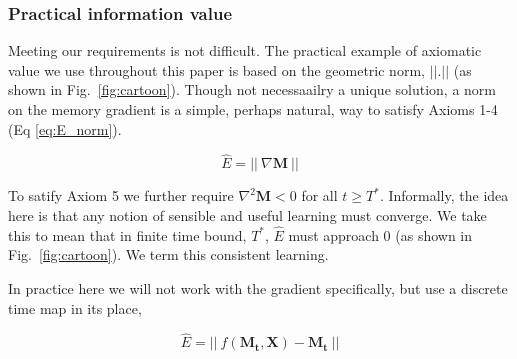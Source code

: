 \subsubsection*{Practical information value}
Meeting our requirements is not difficult. The practical example of axiomatic value we use throughout this paper is based on the geometric norm, $||.||$ (as shown in Fig.~\ref{fig:cartoon}). Though not necessaailry a unique solution, a norm on the memory gradient is a simple, perhaps natural, way to satisfy Axioms 1-4 (Eq \ref{eq:E_norm}). 

\begin{equation}
	\label{eq:E_norm}
	\hat E = || \ \nabla \mathbf{M} \ ||
\end{equation}

To satify Axiom 5 we further require $\nabla^2 \mathbf{M} < 0$ for all $ t \ge T^*$. Informally, the idea here is that any notion of sensible and useful learning must converge. We take this to mean that in finite time bound, $T^*$, $\hat E$ must approach 0 (as shown in Fig.~\ref{fig:cartoon}). We term this consistent learning.

In practice here we will not work with the gradient specifically, but use a discrete time map in its place,

\begin{equation}
	\label{eq:E_norm_discrete}
	\hat E = || \ f(\mathbf{M_t},\mathbf{X}) - \mathbf{M_t} \ ||
\end{equation}

